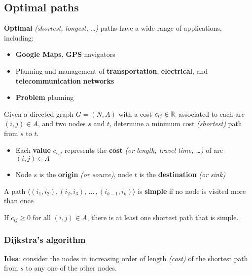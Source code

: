 \documentclass[english]{article}
\begin{document}
\subsection{Optimal paths}

\textbf{Optimal} \textit{(shortest, longest, \ldots)} paths have a wide range of applications, including:

\begin{itemize}
  \item \textbf{Google Maps}, \textbf{GPS} navigators
  \item Planning and management of \textbf{transportation}, \textbf{electrical}, and \textbf{telecommunication} \textbf{networks}
  \item \textbf{Problem} planning
\end{itemize}

\bigskip
\begin{problem}
Given a directed graph \(G = (N, A)\) with a cost \(c_{ij} \in \mathbb{R}\) associated to each arc \((i, j) \in A\), and two nodes \(s\) and \(t\), determine a minimum cost \textit{(shortest)} path from \(s\) to \(t\).
\end{problem}

\begin{itemize}
  \item Each \textbf{value} \(c_{i, j}\) represents the \textbf{cost} \textit{(or length, travel time, \ldots)} of arc \((i, j) \in A\)
  \item Node \(s\) is the \textbf{origin} \textit{(or source)}, node \(t\) is the \textbf{destination} \textit{(or sink)}
\end{itemize}

\begin{property}
  A path \(\langle (i_1, i_2), (i_2, i_3), \, \ldots \,, (i_{k-1}, i_k)  \rangle\) is \textbf{simple} if no node is visited more than once
\end{property}

\begin{property}
  If \(c_{ij} \geq 0\) for all \((i, j) \in A\), there is at least one shortest path that is simple.
\end{property}

\subsubsection{Dijkstra's algorithm}

\textbf{Idea}: consider the nodes in increasing order of length \textit{(cost)} of the shortest path from \(s\) to any one of the other nodes.
\end{document}

